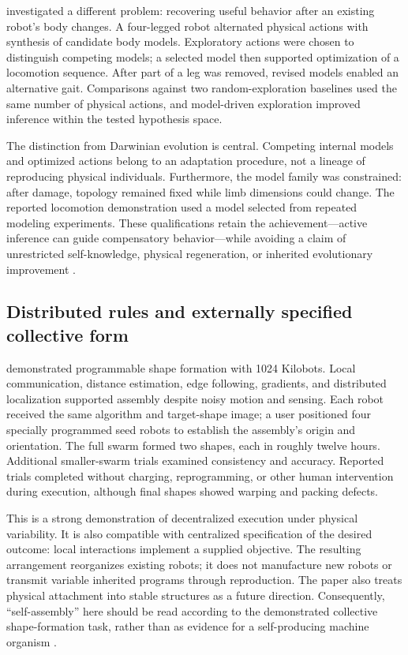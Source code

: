 \citet{hardbongard2006} investigated a different problem: recovering useful
behavior after an existing robot's body changes. A four-legged robot alternated
physical actions with synthesis of candidate body models. Exploratory actions
were chosen to distinguish competing models; a selected model then supported
optimization of a locomotion sequence. After part of a leg was removed, revised
models enabled an alternative gait. Comparisons against two random-exploration
baselines used the same number of physical actions, and model-driven exploration
improved inference within the tested hypothesis space.

The distinction from Darwinian evolution is central. Competing internal models
and optimized actions belong to an adaptation procedure, not a lineage of
reproducing physical individuals. Furthermore, the model family was constrained:
after damage, topology remained fixed while limb dimensions could change. The
reported locomotion demonstration used a model selected from repeated modeling
experiments. These qualifications retain the achievement---active inference can
guide compensatory behavior---while avoiding a claim of unrestricted self-knowledge,
physical regeneration, or inherited evolutionary improvement
\citep{hardbongard2006}.

\subsection{Distributed rules and externally specified collective form}

\citet{hardrubenstein2014} demonstrated programmable shape formation with
1024 Kilobots. Local communication, distance estimation, edge following,
gradients, and distributed localization supported assembly despite noisy motion
and sensing. Each robot received the same algorithm and target-shape image;
a user positioned four specially programmed seed robots to establish the
assembly's origin and orientation. The full swarm formed two shapes, each in
roughly twelve hours. Additional smaller-swarm trials examined consistency and
accuracy. Reported trials completed without charging, reprogramming, or other
human intervention during execution, although final shapes showed warping and
packing defects.

This is a strong demonstration of decentralized execution under physical
variability. It is also compatible with centralized specification of the desired
outcome: local interactions implement a supplied objective. The resulting
arrangement reorganizes existing robots; it does not manufacture new robots or
transmit variable inherited programs through reproduction. The paper also treats
physical attachment into stable structures as a future direction. Consequently,
``self-assembly'' here should be read according to the demonstrated collective
shape-formation task, rather than as evidence for a self-producing machine
organism \citep{hardrubenstein2014}.

